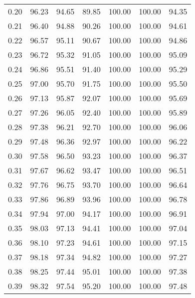 \begin{tabular}{|c|c|c|c|c|c|c|}
      0.20 &     96.23 &     94.65 &      89.85 &  100.00 &     100.00 &         94.35 \\
      0.21 &     96.40 &     94.88 &      90.26 &  100.00 &     100.00 &         94.61 \\
      0.22 &     96.57 &     95.11 &      90.67 &  100.00 &     100.00 &         94.86 \\
      0.23 &     96.72 &     95.32 &      91.05 &  100.00 &     100.00 &         95.09 \\
      0.24 &     96.86 &     95.51 &      91.40 &  100.00 &     100.00 &         95.29 \\
      0.25 &     97.00 &     95.70 &      91.75 &  100.00 &     100.00 &         95.50 \\
      0.26 &     97.13 &     95.87 &      92.07 &  100.00 &     100.00 &         95.69 \\
      0.27 &     97.26 &     96.05 &      92.40 &  100.00 &     100.00 &         95.89 \\
      0.28 &     97.38 &     96.21 &      92.70 &  100.00 &     100.00 &         96.06 \\
      0.29 &     97.48 &     96.36 &      92.97 &  100.00 &     100.00 &         96.22 \\
      0.30 &     97.58 &     96.50 &      93.23 &  100.00 &     100.00 &         96.37 \\
      0.31 &     97.67 &     96.62 &      93.47 &  100.00 &     100.00 &         96.51 \\
      0.32 &     97.76 &     96.75 &      93.70 &  100.00 &     100.00 &         96.64 \\
      0.33 &     97.86 &     96.89 &      93.96 &  100.00 &     100.00 &         96.78 \\
      0.34 &     97.94 &     97.00 &      94.17 &  100.00 &     100.00 &         96.91 \\
      0.35 &     98.03 &     97.13 &      94.41 &  100.00 &     100.00 &         97.04 \\
      0.36 &     98.10 &     97.23 &      94.61 &  100.00 &     100.00 &         97.15 \\
      0.37 &     98.18 &     97.34 &      94.82 &  100.00 &     100.00 &         97.27 \\
      0.38 &     98.25 &     97.44 &      95.01 &  100.00 &     100.00 &         97.38 \\
      0.39 &     98.32 &     97.54 &      95.20 &  100.00 &     100.00 &         97.48 \\

\end{tabular}
